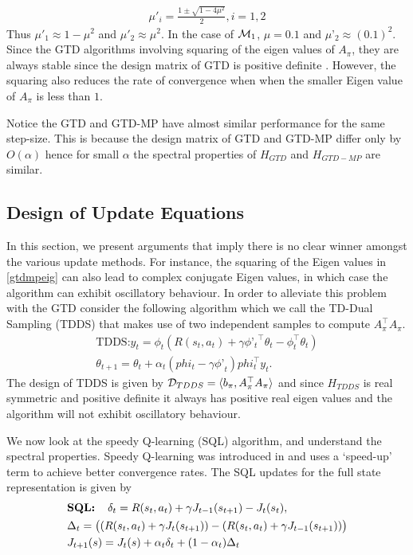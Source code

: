 \begin{align}\label{gtdmpeig}
\mu'_{i}=\frac{1\pm \sqrt{1-4\mu^2}}{2}, i=1,2
\end{align}
Thus $\mu'_1\approx 1-\mu^2$ and $\mu'_2\approx \mu^2$. In the case of $\mathcal{M}_1$, $\mu=0.1$ and $\mu’_2\approx (0.1)^2$. Since the GTD algorithms involving squaring of the eigen values of $A_\pi$, they are always stable since the design matrix of GTD is positive definite \cite{gtdref}. However, the squaring also reduces the rate of convergence when when the smaller Eigen value of $A_\pi$ is less than $1$.

Notice the GTD and GTD-MP have almost similar performance for the same step-size. This is because the design matrix of GTD and GTD-MP differ only by $O(\alpha)$ hence for small $\alpha$ the spectral properties of $H_{GTD}$ and $H_{GTD-MP}$ are similar.
\subsection{Design of Update Equations}
In this section, we present arguments that imply there is no clear winner amongst the various update methods. For instance, the squaring of the Eigen values in \eqref{gtdmpeig} can also lead to complex conjugate Eigen values, in which case the algorithm can exhibit oscillatory behaviour. In order to alleviate this problem with the GTD consider the following algorithm which we call the TD-Dual Sampling (TDDS) that makes use of two independent samples to compute $A_\pi^\top A_\pi$.
\begin{align}\label{tdds}
\text{TDDS:} y_t=\phi_t(R(s_t,a_t)+\gamma{\phi’_t}^\top\theta_t-\phi_t^\top \theta_t)\\
\theta_{t+1}=\theta_t+\alpha_t(phi_t-\gamma{\phi’}_t)phi_t^\top y_t.
\end{align}  
The design of TDDS is given by $\mathcal{D}_{TDDS}=\langle b_\pi, A_\pi^\top A_\pi\rangle$ and since $H_{TDDS}$ is real symmetric and positive definite it always has positive real eigen values and the algorithm will not exhibit oscillatory behaviour.


We now look at the speedy Q-learning (SQL) algorithm, and understand the spectral properties. Speedy Q-learning was introduced in \cite{} and uses a `speed-up' term to achieve better convergence rates. The SQL updates for the full state representation is given by
\begin{align}\label{sql}
\begin{split}
&\textbf{SQL:\quad}\delta_t=R(s_t,a_t)+\gamma J_{t-1}(s_{t+1})-J_{t}(s_t),\\
&\Delta_t= \big((R(s_t,a_t)+\gamma J_t(s_{t+1}))-(R(s_t,a_t)+\gamma J_{t-1}(s_{t+1}))\big)\\&J_{t+1}(s)=J_t(s)+\alpha_t\delta_t+(1-\alpha_t)\Delta_t
\end{split}
\end{align}
